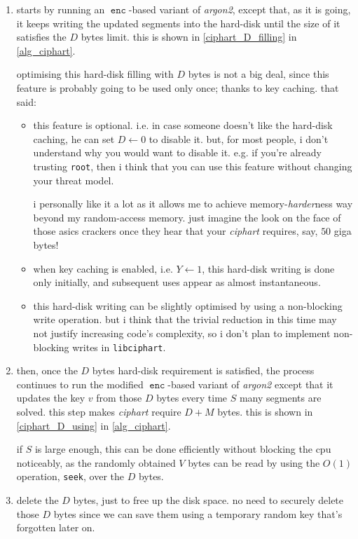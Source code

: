 \documentclass[twocolumn]{article}
\DeclareMathOperator{\enc}{\mathtt{enc}}
\begin{document}
\begin{enumerate}
    \item starts by running an $\enc$-based variant of \emph{argon2},
    except that, as it is going, it keeps writing the updated segments into
    the hard-disk until the size of it satisfies the $D$ bytes limit.  this
    is shown in \cref{ciphart_D_filling} in \cref{alg_ciphart}.

    optimising this hard-disk filling with $D$ bytes is not a big deal,
    since this feature is probably going to be used only once; thanks to
    key caching.  that said:
    \begin{itemize}
        \item this feature is optional.  i.e. in case someone doesn't like
        the hard-disk caching, he can set $D \gets 0$ to disable it.  but,
        for most people, i don't understand why you would want to disable
        it.  e.g. if you're already trusting \texttt{root}, then i think
        that you can use this feature without changing your threat model.

        i personally like it a lot as it allows me to achieve
        memory-\emph{harder}ness way beyond my random-access memory.  just
        imagine the look on the face of those asics crackers once they hear
        that your \emph{ciphart} requires, say, $50$ giga bytes!

        \item when key caching is enabled, i.e. $Y \gets 1$, this hard-disk
        writing is done only initially, and subsequent uses appear as
        almost instantaneous.

        \item this hard-disk writing can be slightly optimised by using a
        non-blocking write operation.  but i think that the trivial
        reduction in this time may not justify increasing  code's
        complexity, so i don't plan to implement non-blocking writes in
        \texttt{libciphart}.
    \end{itemize}

    \item then, once the $D$ bytes hard-disk requirement is satisfied, the
    process continues to run the modified $\enc$-based variant of
    \emph{argon2} except that it updates the key $v$ from those $D$ bytes
    every time $S$ many segments are solved.  this step makes
    \emph{ciphart} require $D+M$ bytes.  this is shown in
    \cref{ciphart_D_using} in \cref{alg_ciphart}.

    if $S$ is large enough, this can be done efficiently without blocking
    the cpu noticeably, as the randomly obtained $V$ bytes can be read by
    using the $O(1)$ operation, \texttt{seek}, over the $D$ bytes.

    \item delete the $D$ bytes, just to free up the disk space.  no need to
    securely delete those $D$ bytes since we can save them using a
    temporary random key that's forgotten later on.
\end{enumerate}
\end{document}
